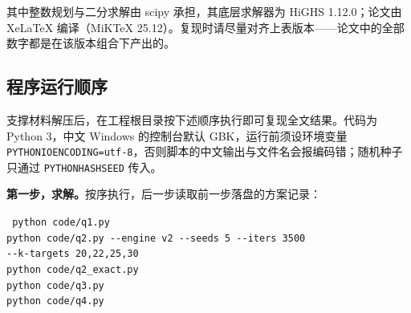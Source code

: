 \noindent 其中整数规划与二分求解由 scipy 承担，其底层求解器为 HiGHS 1.12.0；论文由 XeLaTeX 编译（MiKTeX 25.12）。复现时请尽量对齐上表版本——论文中的全部数字都是在该版本组合下产出的。

\subsection{程序运行顺序}
\label{sec:run-order}

支撑材料解压后，在工程根目录按下述顺序执行即可复现全文结果。代码为 Python 3，中文 Windows 的控制台默认 GBK，运行前须设环境变量 \texttt{PYTHONIOENCODING=utf-8}，否则脚本的中文输出与文件名会报编码错；随机种子只通过 \texttt{PYTHONHASHSEED} 传入。

\textbf{第一步，求解。}按序执行，后一步读取前一步落盘的方案记录：

\begin{center}
	\texttt{\small
		python code/q1.py\\
		python code/q2.py -{}-engine v2 -{}-seeds 5 -{}-iters 3500\\
		\hspace{4em}-{}-k-targets 20,22,25,30\\
		python code/q2\_exact.py\\
		python code/q3.py\\
		python code/q4.py}
\end{center}


